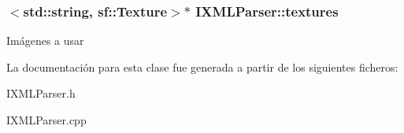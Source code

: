 \subsubsection[{textures}]{$<$std\+::string, sf\+::\+Texture$>$$\ast$ I\+X\+M\+L\+Parser\+::textures\hspace{0.3cm}{\ttfamily [protected]}}\label{classIXMLParser_af05edc520158df67ae6417b626a09407}
Imágenes a usar 

La documentación para esta clase fue generada a partir de los siguientes ficheros\+:\begin{DoxyCompactItemize}
\item 
I\+X\+M\+L\+Parser.\+h\item 
I\+X\+M\+L\+Parser.\+cpp\end{DoxyCompactItemize}
